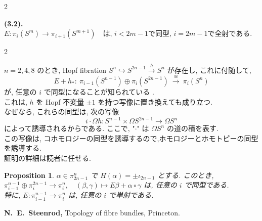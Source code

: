 \documentclass[10pt, leqno]{ltjsarticle}
\newcommand{\Ex}{E}        %
\newcommand{\Ox}{\Omega}   %
\newcommand{\pis}[2]{\pi_{#1}(#2)}       %
\newcommand{\pit}[2]{\pi_{#1}^{#2}}
\numberwithin{equation}{section}
\theoremstyle{plain}
\newtheorem{proposition}[theorem]{Proposition}
\theoremstyle{definition}
\theoremstyle{remark}
\begin{document}
\begin{paracol}{2}


\switchcolumn

\noindent
\textbf{(3.2).}\
\(\Ex: \pis{i}{S^m} \longrightarrow \pis{i+1}{S^{m+1}}
\quad\text{は, } i<2m-1 \text{で同型, } i=2m-1 \text{で全射である. }\)



\end{paracol}

\begin{paracol}{2}

\noindent
$n=2,4,8$ のとき, Hopf fibration
$S^n\hookrightarrow S^{2n-1}\xrightarrow{h} S^n$ が存在し, これに付随して,
\[
E+h_*:\ \pis{i-1}{S^{n-1}}\oplus\pis{i}{S^{2n-1}}
\ \xrightarrow{\ \cong\ }\ \pis{i}{S^n}
\]
が, 任意の \(i\) で同型になることが知られている \cite{Steenrod1951}.\\
これは, $h$ を Hopf 不変量 $\pm1$ を持つ写像に置き換えても成り立つ. \\
なぜなら, これらの同型は, 次の写像
\[
i\cdot\Omega h: S^{n-1}\times\Ox S^{2n-1}\to\Ox S^n
\]
によって誘導されるからである. 
ここで, "\(\cdot\)" は \(\Omega S^n\) の道の積を表す. \\
この写像は, コホモロジーの同型を誘導するので,ホモロジーとホモトピーの同型を誘導する. \\
証明の詳細は読者に任せる. 

\begin{proposition}\label{prop:4.4}
$\alpha\in\pit{2n-1}{n}$ で $H(\alpha)=\pm\iota_{2n-1}$ とする. 
このとき,\\
\(
\pit{i-1}{n-1}\oplus\pit{i}{2n-1}\to\pit{i}{n},\quad
(\beta,\gamma) \longmapsto E\beta + \alpha\circ\gamma
\)
は, 任意の \(i\) で同型である. \\
特に, 
\(
E:\pit{i-1}{n-1}\to \pit{i}{n}
\)
は, 任意の \(i\) で単射である. 
\end{proposition}

\switchcolumn

\noindent
\textbf{
\cite{Steenrod1951}
N.~E.~Steenrod,}
\newblock Topology of fibre bundles,
\newblock Princeton.

\end{paracol}
\end{document}
